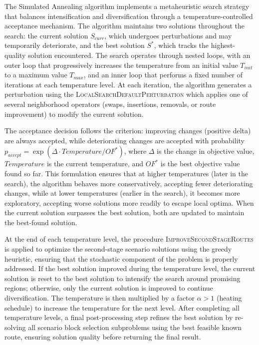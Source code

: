 The Simulated Annealing algorithm implements a metaheuristic search strategy that balances intensification and diversification through a temperature-controlled acceptance mechanism. The algorithm maintains two solutions throughout the search: the current solution $S_{curr}$, which undergoes perturbations and may temporarily deteriorate, and the best solution $S^*$, which tracks the highest-quality solution encountered. The search operates through nested loops, with an outer loop that progressively increases the temperature from an initial value $T_{init}$ to a maximum value $T_{max}$, and an inner loop that performs a fixed number of iterations at each temperature level. At each iteration, the algorithm generates a perturbation using the \textsc{LocalSearchDefaultPerturbation} which applies one of several neighborhood operators (swaps, insertions, removals, or route improvement) to modify the current solution.

The acceptance decision follows the criterion: improving changes (positive delta) are always accepted, while deteriorating changes are accepted with probability $p_{accept} = \exp(\Delta \cdot Temperature / OF^*)$, where $\Delta$ is the change in objective value, $Temperature$ is the current temperature, and $OF^*$ is the best objective value found so far. This formulation ensures that at higher temperatures (later in the search), the algorithm behaves more conservatively, accepting fewer deteriorating changes, while at lower temperatures (earlier in the search), it becomes more exploratory, accepting worse solutions more readily to escape local optima.
When the current solution surpasses the best solution, both are updated to maintain the best-found solution.

At the end of each temperature level, the procedure \textsc{ImproveSecondStageRoutes} is applied to optimize the second-stage scenario solutions using the greedy heuristic, ensuring that the stochastic component of the problem is properly addressed. If the best solution improved during the temperature level, the current solution is reset to the best solution to intensify the search around promising regions; otherwise, only the current solution is improved to continue diversification. The temperature is then multiplied by a factor $\alpha > 1$ (heating schedule) to increase the temperature for the next level. After completing all temperature levels, a final post-processing step refines the best solution by re-solving all scenario block selection subproblems using the best feasible known route, ensuring solution quality before returning the final result.

